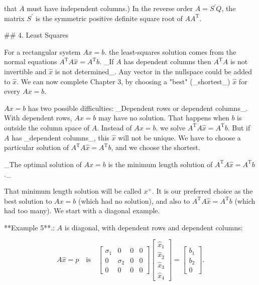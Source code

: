 that \(A\) must have independent columns.) In the reverse order \(A=S^{\prime}Q\), the matrix \(S^{\prime}\) is the symmetric positive definite square root of \(AA^{\mathrm{T}}\).

## 4. Least Squares

For a rectangular system \(Ax=b\). the least-squares solution comes from the normal equations \(A^{\mathrm{T}}A\widehat{x}=A^{\mathrm{T}}b\). _If \(A\) has dependent columns then \(A^{\mathrm{T}}A\) is not invertible and \(\widehat{x}\) is not determined_. Any vector in the nullspace could be added to \(\widehat{x}\). We can now complete Chapter 3, by choosing a "best" (_shortest_) \(\widehat{x}\) for every \(Ax=b\).

\(Ax=b\) has two possible difficulties: _Dependent rows or dependent columns_. With dependent rows, \(Ax=b\) may have no solution. That happens when \(b\) is outside the column space of \(A\). Instead of \(Ax=b\). we solve \(A^{\mathrm{T}}A\widehat{x}=A^{\mathrm{T}}b\). But if \(A\) has _dependent columns_, this \(\widehat{x}\) will not be unique. We have to choose a particular solution of \(A^{\mathrm{T}}A\widehat{x}=A^{\mathrm{T}}b\), and we choose the shortest.

_The optimal solution of \(Ax=b\) is the minimum length solution of \(A^{\mathrm{T}}A\widehat{x}=A^{\mathrm{T}}b\)._

That minimum length solution will be called \(x^{+}\). It is our preferred choice as the best solution to \(Ax=b\) (which had no solution), and also to \(A^{\mathrm{T}}A\widehat{x}=A^{\mathrm{T}}b\) (which had too many). We start with a diagonal example.

**Example 5**.: \(A\) is diagonal, with dependent rows and dependent columns:

\[A\widehat{x}=p\quad\text{is}\quad\begin{bmatrix}\sigma_{1}&0&0&0\\ 0&\sigma_{2}&0&0\\ 0&0&0&0\end{bmatrix}\begin{bmatrix}\widehat{x}_{1}\\ \widehat{x}_{2}\\ \widehat{x}_{3}\\ \widehat{x}_{4}\end{bmatrix}=\begin{bmatrix}b_{1}\\ b_{2}\\ 0\end{bmatrix}.\]


